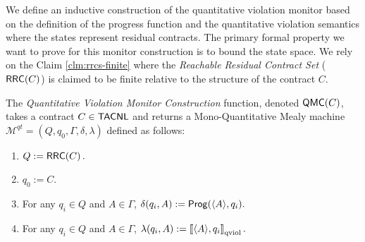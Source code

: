 We define an inductive construction of the quantitative violation monitor based on the definition of the progress function and the quantitative violation semantics where the states represent residual contracts.
 The primary formal property we want to prove for this monitor construction is to bound the state space. We rely on the Claim \ref{clm:rrcs-finite} where the \emph{Reachable Residual Contract Set} ($\mathsf{RRC}\!\left(C\right)$) is claimed to be finite relative to the structure of the contract $C$.

\begin{definition}
  \label{def:qmc}
  The \emph{Quantitative Violation Monitor Construction} function, denoted $\mathsf{QMC}(C)$, takes a contract $C \in \mathsf{TACNL}$ and returns a Mono-Quantitative Mealy machine $\mathcal{M}^{qt} = (Q, q_0, \Gamma, \delta, \lambda)$ defined as follows:
  \begin{enumerate}
  \item $Q := \mathsf{RRC}\!\left(C\right).$
  \item $q_0 := C.$
  \item For any $q_i \in Q$ and $A \in \Gamma$, $\delta(q_i, A) := \mathsf{Prog}(\langle A \rangle ,q_i).$
  \item For any $q_i \in Q$ and $A \in \Gamma$, $\lambda(q_i, A) := \left\llbracket \langle A \rangle , q_i \right\rrbracket_{\text{qviol}}.$
  \end{enumerate}
  \end{definition}

